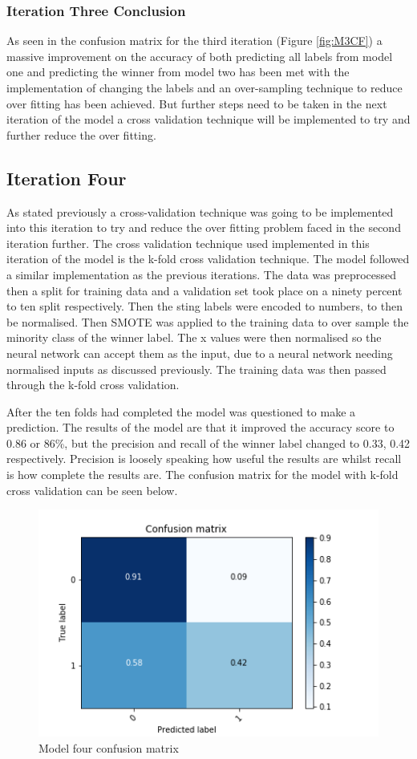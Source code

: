 \subsubsection{Iteration Three Conclusion}
As seen in the confusion matrix for the third iteration (Figure \ref{fig:M3CF}) a massive improvement on the accuracy of both predicting all labels from model one and predicting the winner from model two has been met with the implementation of changing the labels and an over-sampling technique to reduce over fitting has been achieved. But further steps need to be taken in the next iteration of the model a cross validation technique will be implemented to try and further reduce the over fitting.
\subsection{Iteration Four}
As stated previously a cross-validation technique was going to be implemented into this iteration to try and reduce the over fitting problem faced in the second iteration further. The cross validation technique used implemented in this iteration of the model is the k-fold cross validation technique. The model followed a similar implementation as the previous iterations. The data was preprocessed then a split for training data and a validation set took place on a ninety percent to ten split respectively. Then the sting labels were encoded to numbers, to then be normalised. Then SMOTE was applied to the training data to over sample the minority class of the winner label. The x values were then normalised so the neural network can accept them as the input, due to a neural network needing normalised inputs as discussed previously. The training data was then passed through the k-fold cross validation.

After the ten folds had completed the model was questioned to make a prediction. The results of the model are that it improved the accuracy score to 0.86 or 86\%, but the precision and recall of the winner label changed to 0.33, 0.42 respectively. Precision is loosely speaking how useful the results are whilst recall is how complete the results are. The confusion matrix for the model with k-fold cross validation can be seen below. 
\begin{figure}[h!]
  \centering
  \includegraphics[width = (\textwidth)/2]{confusionMatrixkfold.png}
  \caption{Model four confusion matrix}
  \label{fig:M4CF}
\end{figure}
